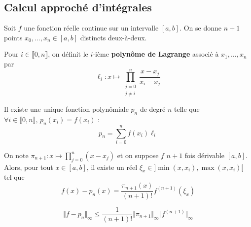 	\subsection{Calcul approché d'intégrales}
	
	
	Soit $f$ une fonction réelle continue sur un intervalle $[a,b]$. On se donne $n+1$ points $x_0, \dots, x_n \in [a,b]$ distincts deux-à-deux.
	
	\begin{definition}
		Pour $i \in \llbracket 0, n \rrbracket$, on définit le $i$-ième \textbf{polynôme de Lagrange} associé à $x_1, \dots, x_n$ par
		\[ \ell_i : x \mapsto \prod_{\substack{j=0\\j \neq i}}^n \frac{x-x_j}{x_i-x_j} \]
	\end{definition}
	
	\begin{theorem}
		Il existe une unique fonction polynômiale $p_n$ de degré $n$ telle que $\forall i \in \llbracket 0, n \rrbracket, \, p_n(x_i) = f(x_i)$ :
		\[ p_n = \sum_{i=0}^n f(x_i) \ell_i \]
	\end{theorem}
	
	\begin{theorem}
		On note $\pi_{n+1} : x \mapsto \prod_{j=0}^{n} (x-x_j)$ et on suppose $f$ $n+1$ fois dérivable $[a,b]$. Alors, pour tout $x \in [a,b]$, il existe un réel $\xi_x \in ]\min(x,x_i),\max(x,x_i)[$ tel que
		\[ f(x)-p_n(x) = \frac{\pi_{n+1}(x)}{(n+1)!} f^{(n+1)}(\xi_x) \]
	\end{theorem}
	
	\begin{corollary}
		\[ \Vert f - p_n \Vert_\infty \leq \frac{1}{(n+1)!} \Vert \pi_{n+1} \Vert_\infty \Vert f^{(n+1)} \Vert_\infty \]
	\end{corollary}
	
	
